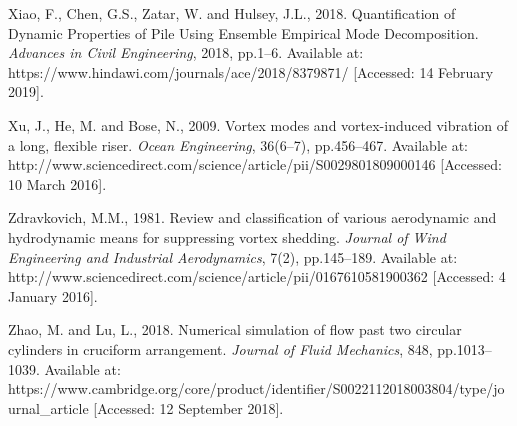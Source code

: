 \documentclass[]{article}
\begin{document}
Xiao, F., Chen, G.S., Zatar, W. and Hulsey, J.L., 2018. Quantification
of Dynamic Properties of Pile Using Ensemble Empirical Mode
Decomposition. \emph{Advances in Civil Engineering}, 2018, pp.1--6.
Available at: https://www.hindawi.com/journals/ace/2018/8379871/
{[}Accessed: 14 February 2019{]}.

Xu, J., He, M. and Bose, N., 2009. Vortex modes and vortex-induced
vibration of a long, flexible riser. \emph{Ocean Engineering}, 36(6--7),
pp.456--467. Available at:
http://www.sciencedirect.com/science/article/pii/S0029801809000146
{[}Accessed: 10 March 2016{]}.

Zdravkovich, M.M., 1981. Review and classification of various
aerodynamic and hydrodynamic means for suppressing vortex shedding.
\emph{Journal of Wind Engineering and Industrial Aerodynamics}, 7(2),
pp.145--189. Available at:
http://www.sciencedirect.com/science/article/pii/0167610581900362
{[}Accessed: 4 January 2016{]}.

Zhao, M. and Lu, L., 2018. Numerical simulation of flow past two
circular cylinders in cruciform arrangement. \emph{Journal of Fluid
Mechanics}, 848, pp.1013--1039. Available at:
https://www.cambridge.org/core/product/identifier/S0022112018003804/type/journal\_article
{[}Accessed: 12 September 2018{]}.
\end{document}
